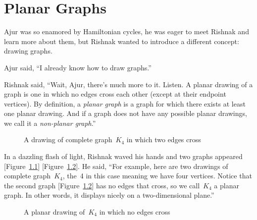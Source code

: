 \chapter{Planar Graphs}
Ajur was so enamored by Hamiltonian cycles, he was eager to meet Rishnak and learn more about them, but Rishnak wanted to introduce a different concept: drawing graphs.

Ajur said, ``I already know how to draw graphs.''

Rishnak said, ``Wait, Ajur, there's much more to it. Listen. A planar drawing of a graph is one in which no edges cross each other (except at their endpoint vertices). By definition, a \textit{planar graph}  is a graph for which there exists at least one planar drawing. And if a graph does not have any possible planar drawings, we call it a \textit{non-planar graph}.''

\begin{figure}
\begin{center}
\caption{A drawing of complete graph~$K_4$ in which two edges cross}\label{9g1}
\end{center}
\end{figure}

In a dazzling flash of light, Rishnak waved his hands and two graphs appeared [Figure~\ref{9g1}] [Figure~\ref{9g2}]. He said, ``For example, here are two drawings of complete graph~$K_4$, the~4 in this case meaning we have four vertices. Notice that the second graph [Figure~\ref{9g2}] has no edges that cross, so we call~$K_4$ a planar graph. In other words, it displays nicely on a two-dimensional plane.''

\begin{figure}
\begin{center}
\caption{A planar drawing of~$K_4$ in which no edges cross}\label{9g2}
\end{center}
\end{figure}

